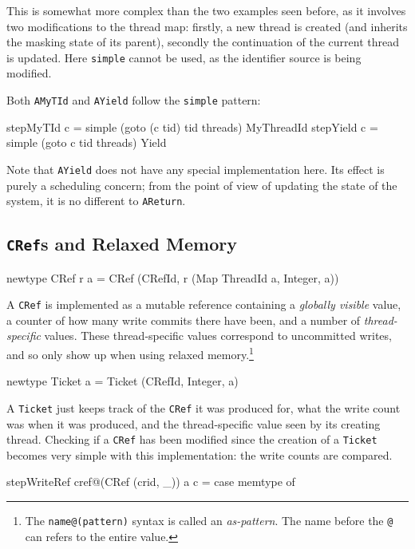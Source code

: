 This is somewhat more complex than the two examples seen before, as it
involves two modifications to the thread map: firstly, a new thread is
created (and inherits the masking state of its parent), secondly the
continuation of the current thread is updated. Here \verb|simple|
cannot be used, as the identifier source is being modified.

Both \verb|AMyTId| and \verb|AYield| follow the \verb|simple| pattern:

\begin{haskellcode}
stepMyTId c = simple (goto (c tid) tid threads) MyThreadId
stepYield c = simple (goto c tid threads) Yield
\end{haskellcode}

Note that \verb|AYield| does not have any special implementation
here. Its effect is purely a scheduling concern; from the point of
view of updating the state of the system, it is no different to
\verb|AReturn|.

\subsection{\texttt{CRef}s and Relaxed Memory}
\label{sec:execution-stepwise-cref}

\begin{haskellcode}
newtype CRef r a = CRef (CRefId, r (Map ThreadId a, Integer, a))
\end{haskellcode}

A \verb|CRef| is implemented as a mutable reference containing a
\emph{globally visible} value, a counter of how many write commits
there have been, and a number of \emph{thread-specific} values. These
thread-specific values correspond to uncommitted writes, and so only
show up when using relaxed memory.\footnote{The
  \texttt{name@(pattern)} syntax is called an \emph{as-pattern}. The
  name before the \texttt{@} can refers to the entire value.}

\begin{haskellcode}
newtype Ticket a = Ticket (CRefId, Integer, a)
\end{haskellcode}

A \verb|Ticket| just keeps track of the \verb|CRef| it was produced
for, what the write count was when it was produced, and the
thread-specific value seen by its creating thread. Checking if a
\verb|CRef| has been modified since the creation of a \verb|Ticket|
becomes very simple with this implementation: the write counts are
compared.

\begin{haskellcode}
stepWriteRef cref@(CRef (crid, _)) a c = case memtype of
\end{haskellcode}

